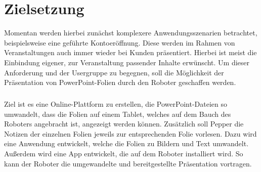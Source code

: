 \section{Zielsetzung}\label{sec:zielsetzung}
Momentan werden hierbei zunächst komplexere Anwendungsszenarien betrachtet,
beispielsweise eine geführte Kontoeröffnung. Diese werden im Rahmen von
Veranstaltungen auch immer wieder bei Kunden präsentiert. Hierbei ist meist die
Einbindung eigener, zur Veranstaltung passender Inhalte erwünscht. Um dieser
Anforderung und der Usergruppe zu begegnen, soll die Möglichkeit der
Präsentation von PowerPoint-Folien durch den Roboter geschaffen werden.

\subparagraph{}
Ziel ist es eine Online-Plattform zu erstellen, die PowerPoint-Dateien so
umwandelt, dass die Folien auf einem Tablet, welches auf dem Bauch des
Roboters angebracht ist, angezeigt werden können.
Zusätzlich soll Pepper die Notizen der einzelnen Folien jeweils zur
entsprechenden Folie vorlesen. Dazu wird eine Anwendung entwickelt, welche die
Folien zu Bildern und Text umwandelt. Außerdem wird eine App entwickelt, die auf
dem Roboter installiert wird. So kann der Roboter die umgewandelte und
bereitgestellte Präsentation vortragen.
